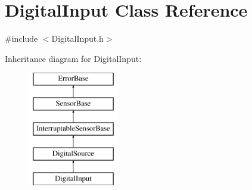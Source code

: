 \hypertarget{classDigitalInput}{
\section{DigitalInput Class Reference}
\label{classDigitalInput}
}


{\ttfamily \#include $<$DigitalInput.h$>$}

Inheritance diagram for DigitalInput:\begin{figure}[H]
\begin{center}
\leavevmode
\includegraphics[height=5.000000cm]{classDigitalInput}
\end{center}
\end{figure}
